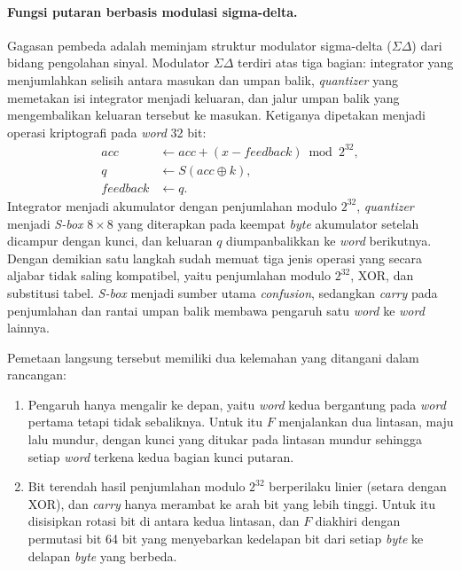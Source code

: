 \paragraph{Fungsi putaran berbasis modulasi sigma-delta.} Gagasan pembeda \algname{} adalah meminjam
struktur modulator sigma-delta ($\Sigma\Delta$) dari bidang pengolahan sinyal.
Modulator $\Sigma\Delta$ terdiri atas tiga bagian: integrator yang menjumlahkan selisih antara masukan
dan umpan balik, \textit{quantizer} yang memetakan isi integrator menjadi keluaran, dan jalur umpan
balik yang mengembalikan keluaran tersebut ke masukan. Ketiganya dipetakan menjadi operasi kriptografi
pada \textit{word} 32 bit:
\begin{align}
  acc      &\leftarrow acc + (x - feedback) \bmod 2^{32}, \\
  q        &\leftarrow S(acc \oplus k), \\
  feedback &\leftarrow q.
\end{align}
Integrator menjadi akumulator dengan penjumlahan modulo $2^{32}$, \textit{quantizer} menjadi
\textit{S-box} $8 \times 8$ yang diterapkan pada keempat \textit{byte} akumulator setelah dicampur
dengan kunci, dan keluaran $q$ diumpanbalikkan ke \textit{word} berikutnya. Dengan demikian satu
langkah sudah memuat tiga jenis operasi yang secara aljabar tidak saling kompatibel, yaitu penjumlahan
modulo $2^{32}$, XOR, dan substitusi tabel. \textit{S-box} menjadi sumber utama
\textit{confusion}, sedangkan \textit{carry} pada penjumlahan dan rantai umpan balik membawa pengaruh
satu \textit{word} ke \textit{word} lainnya.

Pemetaan langsung tersebut memiliki dua kelemahan yang ditangani dalam rancangan:
\begin{enumerate}
  \item Pengaruh hanya mengalir ke depan, yaitu \textit{word} kedua bergantung pada \textit{word}
        pertama tetapi tidak sebaliknya. Untuk itu $F$ menjalankan dua lintasan, maju lalu mundur,
        dengan kunci yang ditukar pada lintasan mundur sehingga setiap \textit{word} terkena kedua
        bagian kunci putaran.
  \item Bit terendah hasil penjumlahan modulo $2^{32}$ berperilaku linier (setara dengan XOR), dan
        \textit{carry} hanya merambat ke arah bit yang lebih tinggi. Untuk itu disisipkan rotasi
        bit di antara kedua lintasan, dan $F$ diakhiri dengan permutasi bit 64 bit yang menyebarkan
        kedelapan bit dari setiap \textit{byte} ke delapan \textit{byte} yang berbeda.
\end{enumerate}

